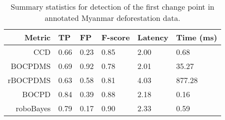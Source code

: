 \begin{table}[H]
\centering
\caption{Summary statistics for detection of the first change point in annotated Myanmar deforestation data.} 
\label{tab:myanmar_results}
\begin{tabular}{rlllll}
  \hline
 Metric & TP & FP & F-score & Latency & Time (ms) \\ 
   \hline
CCD & 0.66 & 0.23 & 0.85 & 2.00 & 0.68 \\ 
  BOCPDMS & 0.69 & 0.92 & 0.78 & 2.01 & 35.27 \\ 
  rBOCPDMS & 0.63 & 0.58 & 0.81 & 4.03 & 877.28 \\ 
  BOCPD & 0.84 & 0.39 & 0.88 & 2.18 & 0.16 \\ 
  roboBayes & 0.79 & 0.17 & 0.90 & 2.33 & 0.59 \\ 
  \end{tabular}
\end{table}
